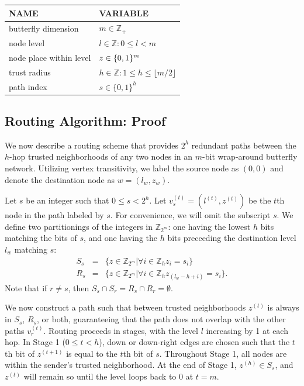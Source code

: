 \documentclass[prodmode,permissions]{acmsmall-ec16}
\newcommand{\beq}{\begin{eqnarray}}
\newcommand{\eeq}{\end{eqnarray}}
\begin{document}
\begin{table}%
{
\begin{tabular}{|l|l|}
\hline
NAME & VARIABLE \\\hline
butterfly dimension & $m \in \mathbb{Z}_+$ \\\hline
node level & $l \in \mathbb{Z} : 0 \leq l < m$ \\\hline
node place within level & $z \in \mathbb \{0,1\}^m$ \\\hline
trust radius & $h \in \mathbb{Z} : 1 \leq h \leq \lfloor m/2 \rfloor$ \\\hline
path index & $s \in \{0,1\}^h$ \\\hline
\end{tabular}
}
\end{table}%

\subsection{Routing Algorithm: Proof}

We now describe a routing scheme that provides $2^h$ redundant paths between
the $h$-hop trusted neighborhoods of any two nodes in an $m$-bit
wrap-around butterfly network.
Utilizing vertex transitivity, we label the source node as $(0, 0)$ and
denote the destination node as $w = (l_w, z_w)$.

Let $s$ be an integer such that $0 \leq s < 2^h$.
Let $v_s^{(t)} = (l^{(t)}, z^{(t)})$ be the $t$th node in the path labeled by $s$.
For convenience, we will omit the subscript $s$.
We define two partitionings of the integers in $\mathbb{Z}_{2^m}$:
one having the lowest $h$ bits matching the
bits of $s$, and one having the $h$ bits preceeding the destination level $l_w$
matching $s$:
\beq
S_s &=& \{z \in \mathbb{Z}_{2^m} | \forall i \in \mathbb{Z}_h z_i = s_i \} \\
R_s &=& \{z \in \mathbb{Z}_{2^m} | \forall i \in \mathbb{Z}_h z_{(l_w - h + i)} = s_i \}.
\eeq
Note that if $r \neq s$, then $S_s \cap S_r = R_s \cap R_r = \emptyset$.

We now construct a path such that between trusted neighborhoods $z^{(t)}$ is always
in $S_s$, $R_s$, or both, guaranteeing that the path does not overlap with the
other paths $v_r^{(t)}$.
Routing proceeds in stages, with the level $l$ increasing by 1 at each hop.
In Stage 1 ($0 \leq t < h$), down or down-right edges
are chosen such that the $t$th bit of $z^{(t+1)}$ is equal to the $t$th bit
of $s$. Throughout Stage 1, all nodes are within the sender's trusted neighborhood.
At the end of Stage 1, $z^{(h)} \in S_s$, and $z^{(t)}$ will remain so until the level loops
back to $0$ at $t = m$.
\end{document}
